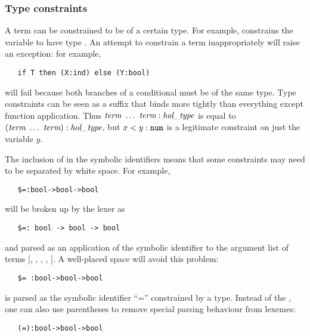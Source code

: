 \subsubsection{Type constraints}
\label{sec:parseprint-type-constraints}

A term can be constrained to be of a certain type.  For example,
 constrains the variable  to have type
. An attempt to constrain a
term inappropriately will raise an exception: for example,
\begin{hol}
\begin{verbatim}
   if T then (X:ind) else (Y:bool)
\end{verbatim}
\end{hol}
will fail because both branches of a conditional must be of the same
type.  Type constraints can be seen as a suffix that binds more
tightly than everything except function application.  Thus $\mbox{\it term}\
\ldots\ \mbox{\it term} : \mbox{\it hol\_type}$ is equal to $(\mbox{\it term}\ \ldots\ \mbox{\it term}) :
\mbox{\it hol\_type}$, but $x < y:\holtxt{num}$ is a legitimate constraint on just
the variable $y$.

The inclusion of \holtxt{:} in the symbolic identifiers means that some
constraints may need to be separated by white space. For example,
\begin{hol}
\begin{verbatim}
   $=:bool->bool->bool
\end{verbatim}
\end{hol}
will be broken up by the \HOL{} lexer as
\begin{hol}
\begin{verbatim}
   $=: bool -> bool -> bool
\end{verbatim}
\end{hol}
and parsed as an application of the symbolic identifier \holtxt{\$=:} to
the argument list of terms [, \holtxt{->}, \holtxt{bool},
\holtxt{->}, \holtxt{bool}]. A well-placed space will avoid this problem:
\begin{hol}
\begin{verbatim}
   $= :bool->bool->bool
\end{verbatim}
\end{hol}
is parsed as the symbolic identifier ``='' constrained by a type.
Instead of the \holtxt{\$}, one can also use parentheses to remove
special parsing behaviour from lexemes:
\begin{hol}
\begin{verbatim}
   (=):bool->bool->bool
\end{verbatim}
\end{hol}


